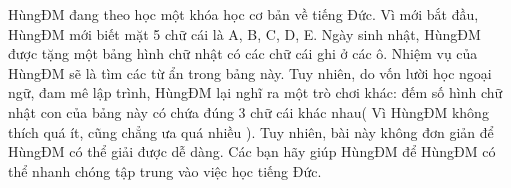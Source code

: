 HùngĐM đang theo học một khóa học cơ bản về tiếng Đức. Vì mới bắt đầu, HùngĐM mới biết mặt 5 chữ cái là A, B, C, D, E. Ngày sinh nhật, HùngĐM được tặng một bảng hình chữ nhật có các chữ cái ghi ở các ô. Nhiệm vụ của HùngĐM sẽ là tìm các từ ẩn trong bảng này. Tuy nhiên, do vốn lười học ngoại ngữ, đam mê lập trình, HùngĐM lại nghĩ ra một trò chơi khác: đếm số hình chữ nhật con của bảng này có chứa đúng 3 chữ cái khác nhau( Vì HùngĐM không thích quá ít, cũng chẳng ưa quá nhiều ). Tuy nhiên, bài này không đơn giản để HùngĐM có thể giải được dễ dàng. Các bạn hãy giúp HùngĐM để HùngĐM có thể nhanh chóng tập trung vào việc học tiếng Đức.  

\